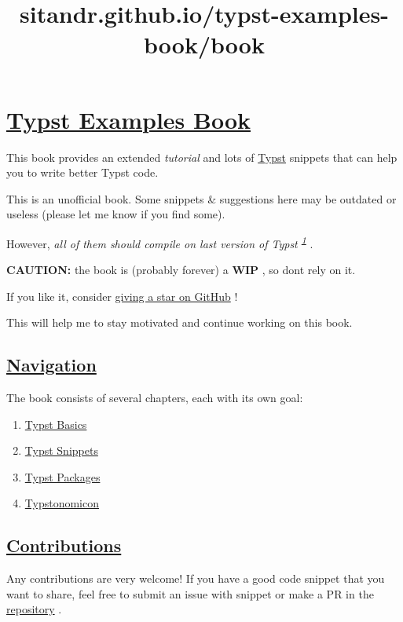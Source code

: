 \title{sitandr.github.io/typst-examples-book/book}

\section{\texorpdfstring{\hyperref[typst-examples-book]{Typst Examples
Book}}{Typst Examples Book}}\label{typst-examples-book}

This book provides an extended \emph{tutorial} and lots of
\href{https://github.com/typst/typst}{Typst} snippets that can help you
to write better Typst code.

This is an unofficial book. Some snippets \& suggestions here may be
outdated or useless (please let me know if you find some).

However, \emph{all of them should compile on last version of Typst
\textsuperscript{\hyperref[1]{1}}} .

\textbf{CAUTION:} the book is (probably forever) a \textbf{WIP} , so
don\textquotesingle t rely on it.

If you like it, consider
\href{https://github.com/sitandr/typst-examples-book}{giving a star on
GitHub} !

This will help me to stay motivated and continue working on this book.

\subsection{\texorpdfstring{\hyperref[navigation]{Navigation}}{Navigation}}\label{navigation}

The book consists of several chapters, each with its own goal:

\begin{enumerate}
\tightlist
\item
  \href{./basics/index.html}{Typst Basics}
\item
  \href{./snippets/index.html}{Typst Snippets}
\item
  \href{./packages/index.html}{Typst Packages}
\item
  \href{./typstonomicon/index.html}{Typstonomicon}
\end{enumerate}

\subsection{\texorpdfstring{\hyperref[contributions]{Contributions}}{Contributions}}\label{contributions}

Any contributions are very welcome! If you have a good code snippet that
you want to share, feel free to submit an issue with snippet or make a
PR in the
\href{https://github.com/sitandr/typst-examples-book}{repository} .

